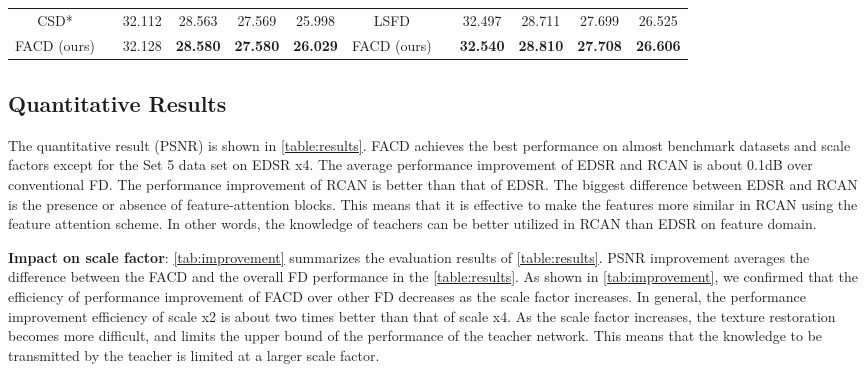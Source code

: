 \documentclass[10pt,twocolumn,letterpaper]{article}
\begin{document}
\begin{table*}[h]
{\begin{tabular}{|c|c|c|c|c|c|c|c|c|c|c|c|}
\multicolumn{1}{|c|}{CSD*}       &     & \multicolumn{1}{c|}{32.112} & \multicolumn{1}{c|}{{28.563}} & \multicolumn{1}{c|}{27.569} & \multicolumn{1}{c|}{25.998}   & \multicolumn{1}{c|}{LSFD}        &     & \multicolumn{1}{c|}{{32.497}} & \multicolumn{1}{c|}{28.711} & \multicolumn{1}{c|}{{27.699}} & \multicolumn{1}{c|}{26.525}   \\ 
\multicolumn{1}{|c|}{FACD (ours)} &    & \multicolumn{1}{c|}{{32.128}} & \multicolumn{1}{c|}{\textbf{28.580}} & \multicolumn{1}{c|}{\textbf{27.580}} & \multicolumn{1}{c|}{\textbf{26.029}}   & \multicolumn{1}{c|}{FACD (ours)} &     & \multicolumn{1}{c|}{\textbf{32.540}} & \multicolumn{1}{c|}{\textbf{28.810}} & \multicolumn{1}{c|}{\textbf{27.708}} & \multicolumn{1}{c|}{\textbf{26.606}}   \\ \hline
  
\end{tabular}}
\label{table:results}
\end{table*}

\subsection{Quantitative Results}
The quantitative result (PSNR) is shown in \cref{table:results}. FACD achieves the best performance on almost benchmark datasets and scale factors except for the Set 5 data set on EDSR x4. The average performance improvement of EDSR and RCAN is about 0.1dB over conventional FD. The performance improvement of RCAN is better than that of EDSR. The biggest difference between EDSR and RCAN is the presence or absence of feature-attention blocks. This means that it is effective to make the features more similar in RCAN using the feature attention scheme. In other words, the knowledge of teachers can be better utilized in RCAN than EDSR on feature domain.

\noindent \textbf{Impact on scale factor}: \cref{tab:improvement} summarizes the evaluation results of \cref{table:results}. PSNR improvement averages the difference between the FACD and the overall FD performance in the \cref{table:results}. As shown in \cref{tab:improvement}, we confirmed that the efficiency of performance improvement of FACD over other FD decreases as the scale factor increases. In general, the performance improvement efficiency of scale x2 is about two times better than that of scale x4. As the scale factor increases, the texture restoration becomes more difficult, and limits the upper bound of the performance of the teacher network. This means that the knowledge to be transmitted by the teacher is limited at a larger scale factor. 
\end{document}
